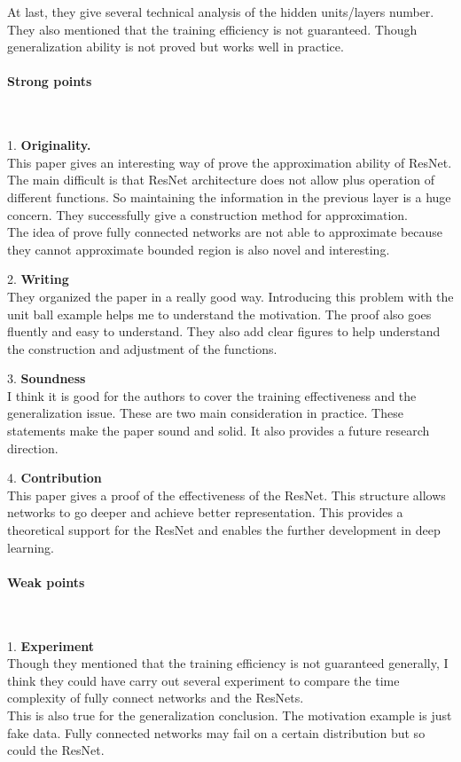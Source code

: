\documentclass{article}
\begin{document}
At last, they give several technical analysis of the hidden units/layers number. They also mentioned that the training efficiency is not guaranteed. Though generalization ability is not proved but works well in practice.

\paragraph{Strong points}  \  

1. \textbf{Originality.}  \\
This paper gives an interesting way of prove the approximation ability of ResNet. The main difficult is that ResNet architecture does not allow plus operation of different functions. So maintaining the information in the previous layer is a huge concern. They successfully give a construction method for approximation. 
\\
The idea of prove fully connected networks are not able to approximate because they cannot approximate bounded region is also novel and interesting.

2. \textbf{Writing}  \\
They organized the paper in a really good way. Introducing this problem with the unit ball example helps me to understand the motivation. The proof also goes fluently and easy to understand. They also add clear figures to help understand the construction and adjustment of the functions.

3. \textbf{Soundness} \\
I think it is good for the authors to cover the training effectiveness and the generalization issue. These are two main consideration in practice. These statements make the paper sound and solid. It also provides a future research direction.

4. \textbf{Contribution} \\
This paper gives a proof of the effectiveness of the ResNet. This structure allows networks to go deeper and achieve better representation. This provides a theoretical support for the ResNet and enables the further development in deep learning.

\paragraph{Weak points}  \ 

1. \textbf{Experiment} \\
Though they mentioned that the training efficiency is not guaranteed generally, I think they could have carry out several experiment to compare the time complexity of fully connect networks and the ResNets.
\\
This is also true for the generalization conclusion. The motivation example is just fake data. Fully connected networks may fail on a certain distribution but so could the ResNet.
\end{document}
